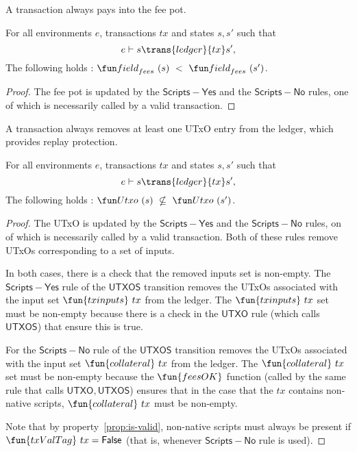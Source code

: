 \begin{property}
  \label{prop:pay-fees}

A transaction always pays into the fee pot.

\begin{lemma}
  For all environments $e$, transactions $tx$ and states $s, s'$ such that
  \begin{equation*}
    e\vdash s\trans{ledger}{tx}s',
  \end{equation*}
  The following holds : $\field_{fees}~(s)~<~\field_{fees}~(s')$.
\end{lemma}
\begin{proof}
  The fee pot is updated by the $\mathsf{Scripts{-}Yes}$ and the $\mathsf{Scripts{-}No}$
  rules, one of which is necessarily called by a valid transaction.
\end{proof}
\end{property}

\begin{property}
  \label{prop:replay}

A transaction always removes at least one UTxO entry from the ledger, which provides
replay protection.

\begin{lemma}
  For all environments $e$, transactions $tx$ and states $s, s'$ such that
  \begin{equation*}
    e\vdash s\trans{ledger}{tx}s',
  \end{equation*}
  The following holds : $\Utxo~(s)~\nsubseteq~\Utxo~(s')$.
\end{lemma}
\begin{proof}
  The UTxO is updated by the $\mathsf{Scripts{-}Yes}$ and the $\mathsf{Scripts{-}No}$
  rules, on of which is necessarily called by a valid transaction. Both of these
  rules remove UTxOs corresponding to a set of inputs.

  In both cases, there is a check that the removed inputs set is non-empty.
  The $\mathsf{Scripts{-}Yes}$ rule of the $\mathsf{UTXOS}$ transition
  removes the UTxOs associated with the input set $\fun{txinputs}~{tx}$ from the ledger.
  The $\fun{txinputs}~{tx}$ set must be non-empty because there is a check in the
  $\mathsf{UTXO}$ rule (which calls $\mathsf{UTXOS}$) that ensure this is true.

  For the $\mathsf{Scripts{-}No}$ rule of the $\mathsf{UTXOS}$ transition
  removes the UTxOs associated with the input set $\fun{collateral}~{tx}$ from the ledger.
  The $\fun{collateral}~{tx}$ set must be non-empty because
  the $\fun{feesOK}$ function (called by the same rule that calls $\mathsf{UTXO},
  \mathsf{UTXOS}$) ensures that in the case that the $tx$ contains non-native scripts,
  $\fun{collateral}~{tx}$ must be non-empty.

  Note that by property~\ref{prop:is-valid}, non-native scripts must always be present
  if $\fun{txValTag}~tx = \False$ (that is, whenever $\mathsf{Scripts{-}No}$ rule is used).
\end{proof}
\end{property}

